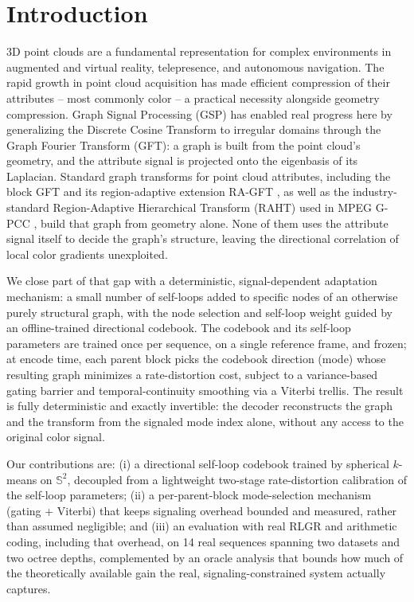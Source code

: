 \documentclass[conference]{IEEEtran}
\begin{document}
\section{Introduction}
3D point clouds are a fundamental representation for complex environments in augmented and
virtual reality, telepresence, and autonomous navigation. The rapid growth in point cloud
acquisition has made efficient compression of their attributes -- most commonly color -- a
practical necessity alongside geometry compression. Graph Signal Processing (GSP) has enabled
real progress here by generalizing the Discrete Cosine Transform to irregular domains through
the Graph Fourier Transform (GFT): a graph is built from the point cloud's geometry, and the
attribute signal is projected onto the eigenbasis of its Laplacian. Standard graph transforms
for point cloud attributes, including the block GFT \cite{zhang2014point} and its
region-adaptive extension RA-GFT \cite{pavez2020region}, as well as the industry-standard
Region-Adaptive Hierarchical Transform (RAHT) \cite{dequeiroz2016raht} used in MPEG G-PCC
\cite{graziosi2020overview}, build that graph from geometry alone. None of them uses the
attribute signal itself to decide the graph's structure, leaving the directional correlation of
local color gradients unexploited.

We close part of that gap with a deterministic, signal-dependent adaptation mechanism: a small
number of self-loops added to specific nodes of an otherwise purely structural graph, with the
node selection and self-loop weight guided by an offline-trained directional codebook. The
codebook and its self-loop parameters are trained once per sequence, on a single reference
frame, and frozen; at encode time, each parent block picks the codebook direction (mode) whose
resulting graph minimizes a rate-distortion cost, subject to a variance-based gating barrier and
temporal-continuity smoothing via a Viterbi trellis. The result is fully deterministic and
exactly invertible: the decoder reconstructs the graph and the transform from the signaled mode
index alone, without any access to the original color signal.

Our contributions are: (i) a directional self-loop codebook trained by spherical $k$-means on
$\mathbb{S}^2$, decoupled from a lightweight two-stage rate-distortion calibration of the
self-loop parameters; (ii) a per-parent-block mode-selection mechanism (gating + Viterbi) that
keeps signaling overhead bounded and measured, rather than assumed negligible; and (iii) an
evaluation with real RLGR and arithmetic coding, including that overhead, on 14 real sequences
spanning two datasets and two octree depths, complemented by an oracle analysis that bounds how
much of the theoretically available gain the real, signaling-constrained system actually
captures.
\end{document}
